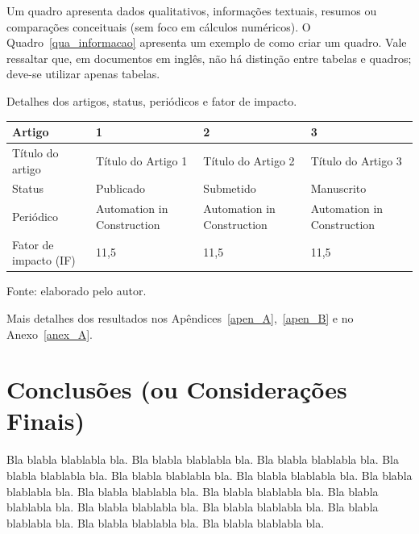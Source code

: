 \documentclass[diss,capa,times,english]{ppgci}
\begin{document}
Um quadro apresenta dados qualitativos, informações textuais, resumos ou comparações conceituais (sem foco em cálculos numéricos). O Quadro~\ref{qua_informacao} apresenta um exemplo de como criar um quadro. Vale ressaltar que, em documentos em inglês, não há distinção entre tabelas e quadros; deve-se utilizar apenas tabelas. 

\begin{quadro}[!htbp]
    \centering
    \caption{Detalhes dos artigos, status, periódicos e fator de impacto.}
    \label{qua_informacao}
    \begin{tabular}{|x{5cm}|x{3cm}|x{3cm}|x{3cm}|}
        \hline
        {\small \textbf{Artigo}} & {\small \textbf{1}} & {\small \textbf{2}} & {\small \textbf{3}}\\
        \hline
        {\small Título do artigo} & {\small Título do Artigo 1} & {\small Título do Artigo 2} & {\small Título do Artigo 3}\\
        \hline
        {\small Status} & {\small Publicado} & {\small Submetido} & {\small Manuscrito}\\
        \hline
        {\small Periódico} & {\small Automation in Construction} & {\small Automation in Construction} & {\small Automation in Construction}\\
        \hline
        {\small Fator de impacto (IF)} & {\small 11,5} & {\small 11,5} & {\small 11,5}\\
        \hline
    \end{tabular}
    \vspace{2pt}
    {\small Fonte: elaborado pelo autor.}
\end{quadro}

Mais detalhes dos resultados nos Apêndices~\ref{apen_A},~\ref{apen_B} e no Anexo~\ref{anex_A}.

\chapter{Conclusões (ou Considerações Finais)} %

Bla blabla blablabla bla.  Bla blabla blablabla bla.  Bla blabla
blablabla bla. Bla blabla blablabla bla.  Bla blabla blablabla bla.  Bla blabla
blablabla bla.  Bla blabla
blablabla bla.  Bla blabla blablabla bla.  Bla blabla blablabla bla.
Bla blabla blablabla bla.  Bla blabla blablabla bla.  Bla blabla
blablabla bla.  Bla blabla blablabla bla.  Bla blabla blablabla bla.
Bla blabla blablabla bla. 
\end{document}

